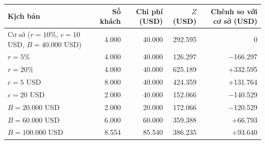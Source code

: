 \begin{tabular}{lrrrr}
\toprule
Kịch bản & Số khách & Chi phí (USD) & $Z$ (USD) & Chênh so với cơ sở (USD) \\
\midrule
Cơ sở ($r=10\%$, $c=10$ USD, $B=40.000$ USD) & 4.000 & 40.000 & 292.595 & 0 \\
$r=5\%$ & 4.000 & 40.000 & 126.297 & $-$166.297 \\
$r=20\%$ & 4.000 & 40.000 & 625.189 & +332.595 \\
$c=5$ USD & 8.000 & 40.000 & 424.359 & +131.764 \\
$c=20$ USD & 2.000 & 40.000 & 152.066 & $-$140.529 \\
$B=20.000$ USD & 2.000 & 20.000 & 172.066 & $-$120.529 \\
$B=60.000$ USD & 6.000 & 60.000 & 359.388 & +66.793 \\
$B=100.000$ USD & 8.554 & 85.540 & 386.235 & +93.640 \\
\bottomrule
\end{tabular}
